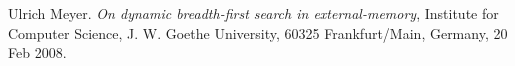 \begin{thebibliography}{9}

  Ulrich Meyer.
  \textit{On dynamic breadth-first search in external-memory},
  Institute for Computer Science, J. W. Goethe University, 60325 Frankfurt/Main, Germany,
  20 Feb 2008.

\end{thebibliography}